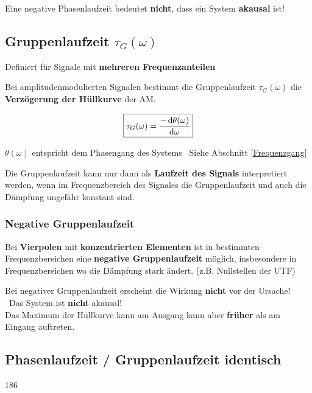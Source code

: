 Eine negative Phasenlaufzeit bedeutet \textbf{nicht}, dass ein System \textbf{akausal} ist!


\subsection[Gruppenlaufzeit]{Gruppenlaufzeit $\tau_G(\omega)$}

Definiert für Signale mit \textbf{mehreren Frequenzanteilen}

\vspace{0.2cm}

Bei amplitudenmodulierten Signalen bestimmt die Gruppenlaufzeit $\tau_G(\omega)$ die \textbf{Verzögerung der Hüllkurve} der AM.

$$ \boxed{ \tau_G(\omega) = \frac{- \mathop{} \! \mathrm{d} \theta(\omega)}{\mathop{} \! \mathrm{d} \omega} } $$

$ \theta(\omega)$ entspricht dem Phasengang des Systems \textrightarrow\ Siehe Abschnitt \ref{Frequenzgang}

\vspace{0.2cm}

Die Gruppenlaufzeit kann nur dann als \textbf{Laufzeit des Signals} interpretiert werden, wenn im Frequenzbereich des Signales die Gruppenlaufzeit und auch die Dämpfung ungefähr konstant sind.


\subsubsection{Negative Gruppenlaufzeit}

Bei \textbf{Vierpolen} mit \textbf{konzentrierten Elementen} ist in bestimmten Frequenzbereichen eine \textbf{negative Gruppenlaufzeit} 
möglich, insbesondere in Frequenzbereichen wo die Dämpfung stark ändert. (z.B. Nullstellen der UTF)

\vspace{0.2cm}

Bei negativer Gruppenlaufzeit erscheint die Wirkung \textbf{nicht} vor der Ursache! \\
\textrightarrow\ Das System ist \textbf{nicht} akausal! \\
Das Maximum der Hüllkurve kann am Ausgang kann aber \textbf{früher} als am Eingang auftreten.



\subsection{Phasenlaufzeit / Gruppenlaufzeit identisch}{186}

